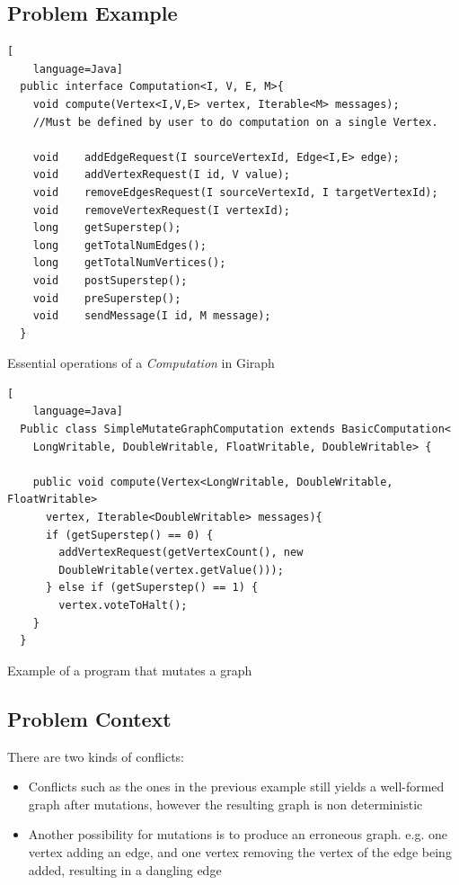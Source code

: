 \subsection{Problem Example}
\begin{frame}[fragile]
\begin{lstlisting}[
    language=Java]
  public interface Computation<I, V, E, M>{
    void compute(Vertex<I,V,E> vertex, Iterable<M> messages);
    //Must be defined by user to do computation on a single Vertex.
	
    void 	addEdgeRequest(I sourceVertexId, Edge<I,E> edge);
    void 	addVertexRequest(I id, V value);
    void 	removeEdgesRequest(I sourceVertexId, I targetVertexId);
    void 	removeVertexRequest(I vertexId);
    long 	getSuperstep();
    long 	getTotalNumEdges();
    long 	getTotalNumVertices();
    void 	postSuperstep();
    void 	preSuperstep();
    void 	sendMessage(I id, M message);
  }
\end{lstlisting}
Essential operations of a \textit{Computation} in Giraph
\let\thefootnote\relax{}
\end{frame}

\begin{frame}[fragile]
\begin{lstlisting}[
    language=Java]
  Public class SimpleMutateGraphComputation extends BasicComputation<
    LongWritable, DoubleWritable, FloatWritable, DoubleWritable> {

    public void compute(Vertex<LongWritable, DoubleWritable, FloatWritable>
      vertex, Iterable<DoubleWritable> messages){ 
      if (getSuperstep() == 0) {
      	addVertexRequest(getVertexCount(), new
      	DoubleWritable(vertex.getValue()));
      } else if (getSuperstep() == 1) {
        vertex.voteToHalt();
    } 
  }
\end{lstlisting}
Example of a program that mutates a graph
\end{frame}

\subsection{Problem Context}
\begin{frame}
There are two kinds of conflicts:
\linebreak
\begin{itemize}
\item Conflicts such as the ones in the previous example still yields a well-formed graph after mutations, however the resulting graph is non deterministic
\linebreak
\item Another possibility for mutations is to produce an erroneous graph. e.g. one vertex adding an edge, and one vertex removing the vertex of the edge being added, resulting in a dangling edge
\end{itemize} 
\end{frame}

